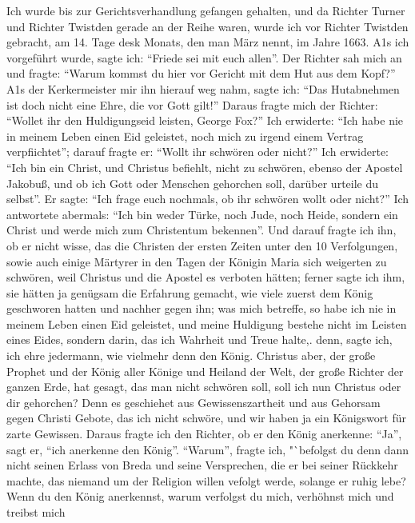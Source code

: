 Ich wurde bis zur Gerichtsverhandlung gefangen gehalten, und
da Richter Turner und Richter Twistden gerade an der Reihe waren,
wurde ich vor Richter Twistden gebracht, am 14. Tage desk Monats, 
den man März nennt, im Jahre 1663. A1s ich 
vorgeführt wurde, sagte ich: "`Friede sei mit euch allen"'. Der
Richter sah mich an und fragte: "`Warum kommst du hier vor
Gericht mit dem Hut aus dem Kopf?"' A1s der Kerkermeister mir
ihn hierauf weg nahm, sagte ich: "`Das Hutabnehmen ist doch nicht
eine Ehre, die vor Gott gilt!"' Daraus fragte mich der Richter:
"`Wollet ihr den Huldigungseid leisten, George Fox?"' Ich erwiderte: 
"`Ich habe nie in meinem Leben einen Eid geleistet, noch
mich zu irgend einem Vertrag verpfiichtet"'; darauf fragte er:
"`Wollt ihr schwören oder nicht?"' Ich erwiderte: "`Ich bin ein
Christ, und Christus befiehlt, nicht zu schwören, ebenso der Apostel
Jakobuß, und ob ich Gott oder Menschen gehorchen soll, darüber
urteile du selbst"'. Er sagte: "`Ich frage euch nochmals, ob ihr
schwören wollt oder nicht?"' Ich antwortete abermals: "`Ich bin
weder Türke, noch Jude, noch Heide, sondern ein Christ und
werde mich zum Christentum bekennen"'. Und darauf fragte ich
ihn, ob er nicht wisse, das die Christen der ersten Zeiten unter
den 10 Verfolgungen, sowie auch einige Märtyrer in den Tagen
der Königin Maria sich weigerten zu schwören, weil Christus
und die Apostel es verboten hätten; ferner sagte ich ihm, sie
hätten ja genügsam die Erfahrung gemacht, wie viele zuerst dem
König geschworen hatten und nachher gegen ihn; was mich betreffe, 
so habe ich nie in meinem Leben einen Eid geleistet, und
meine Huldigung bestehe nicht im Leisten eines Eides, sondern
darin, das ich Wahrheit und Treue halte,. denn, sagte ich, ich
ehre jedermann, wie vielmehr denn den König. Christus aber,
der große Prophet und der König aller Könige und Heiland der
Welt, der große Richter der ganzen Erde, hat gesagt, das man
nicht schwören soll, soll ich nun Christus oder dir gehorchen?
Denn es geschiehet aus Gewissenszartheit und aus Gehorsam gegen
Christi Gebote, das ich nicht schwöre, und wir haben ja ein
Königswort für zarte Gewissen. Daraus fragte ich den
Richter, ob er den König anerkenne: "`Ja"', sagt er, "`ich 
anerkenne den König"'. "`Warum"', fragte ich, "`befolgst du denn dann
nicht seinen Erlass von Breda und 
seine Versprechen, die er bei
seiner Rückkehr machte, das niemand um der Religion willen 
vefolgt werde, solange er ruhig lebe? Wenn du den König anerkennst, 
warum verfolgst du mich, verhöhnst mich und treibst mich
